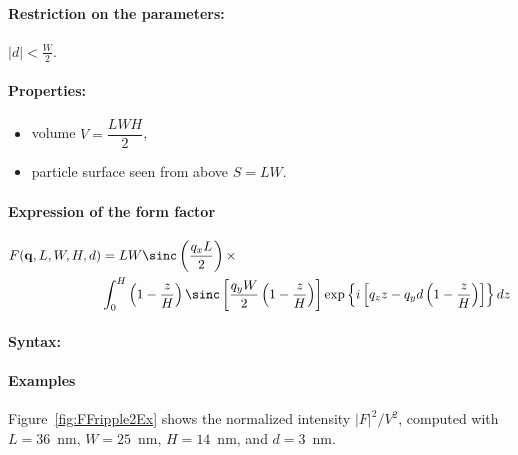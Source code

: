 \paragraph{Restriction on the parameters:} $|d| < \frac{W}{2} $.

\paragraph{Properties:}
\begin{itemize}
\item volume $V = \dfrac{L W H}{2}$,
\item particle surface seen from above $S = L W$.
\end{itemize}

\paragraph{Expression of the form factor}
\begin{align*}
F(\mathbf{q},L,W,H,d) &=L W
\sinc\left(\frac{q_xL}{2}\right)\times \\ &
\int_0^H 
\left(1-\frac{z}{H}\right)
 \sinc\left[\frac{q_y
    W}{2}\left(1-\frac{z}{H}\right)\right] 
\exp\left\{ i\left[q_zz -
    q_yd\left(1-\frac{z}{H}\right)\right]\right\} 
dz
\end{align*}

\paragraph{Syntax:} 

\paragraph{Examples}
Figure~\ref{fig:FFripple2Ex} shows the normalized intensity
$|F|^2/V^2$, computed with $L=36$~nm, $W=25$~nm, $H=14$~nm, and $d=3$~nm.

